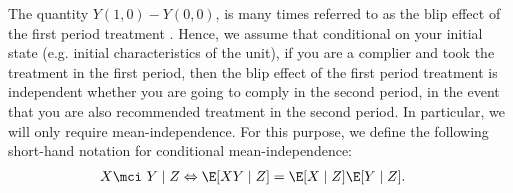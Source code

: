 The quantity $Y(1,0)-Y(0,0)$, is many times referred to as the blip effect of the first period treatment \citep{robins2004optimal}. Hence, we assume that conditional on your initial state (e.g. initial characteristics of the unit), if you are a complier and took the treatment in the first period, then the blip effect of the first period treatment is independent whether you are going to comply in the second period, in the event that you are also recommended treatment in the second period. In particular, we will only require mean-independence. For this purpose, we define the following short-hand notation for conditional mean-independence:
\begin{align}
X \mci~& Y \mid Z \Leftrightarrow \E[X Y\mid Z] = \E[X\mid Z] \E[Y\mid Z].
\end{align}


